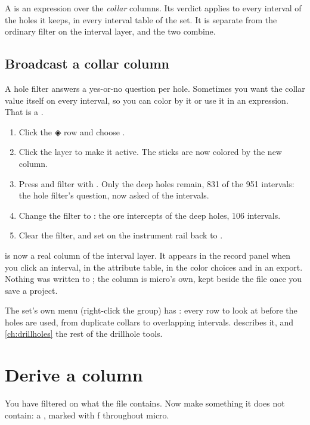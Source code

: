 A  is an expression over the \emph{collar} columns. Its verdict applies to every interval of the holes it keeps, in every interval table of the set. It is separate from the ordinary filter on the interval layer, and the two combine.

\subsection{Broadcast a collar column}
A hole filter answers a yes-or-no question per hole. Sometimes you want the collar value itself on every interval, so you can color by it or use it in an expression. That is a .

\begin{tryit}
\begin{enumerate}
\item Click the ◈ row and choose .
\item Click the  layer to make it active. The sticks are now colored by the new  column.
\item Press \key{/} and filter with . Only the deep holes remain, 831 of the 951 intervals: the hole filter's question, now asked of the intervals.
\item Change the filter to : the ore intercepts of the deep holes, 106 intervals.
\item Clear the filter, and set  on the instrument rail back to .
\end{enumerate}
\end{tryit}

 is now a real column of the interval layer. It appears in the record panel when you click an interval, in the attribute table, in the color choices and in an export. Nothing was written to ; the column is micro's own, kept beside the file once you save a project.

\begin{note}
The set's own menu (right-click the  group) has : every row to look at before the holes are used, from duplicate collars to overlapping intervals.  describes it, and \cref{ch:drillholes} the rest of the drillhole tools.
\end{note}

\section{Derive a column}\label{sec:tour-calc}
You have filtered on what the file contains. Now make something it does not contain: a , marked with ƒ throughout micro.


